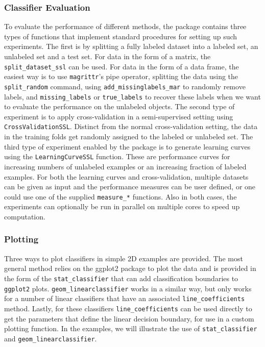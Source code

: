 \documentclass[runningheads,a4paper]{llncs}\usepackage[]{graphicx}\usepackage[]{color}
\begin{document}
\subsubsection{Classifier Evaluation}
To evaluate the performance of different methods, the package contains three types of functions that implement standard procedures for setting up such experiments. The first is by splitting a fully labeled dataset into a labeled set, an unlabeled set and a test set. For data in the form of a matrix, the \texttt{split\_dataset\_ssl} can be used. For data in the form of a data frame, the easiest way is to use \texttt{magrittr}'s pipe operator, splitting the data using the \texttt{split\_random} command, using \texttt{add\_missinglabels\_mar} to randomly remove labels, and \texttt{missing\_labels} or \texttt{true\_labels} to recover these labels when we want to evaluate the performance on the unlabeled objects.
The second type of experiment is to apply cross-validation in a semi-supervised setting using \texttt{CrossValidationSSL}. Distinct from the normal cross-validation setting, the data in the training folds get randomly assigned to the labeled or unlabeled set.
The third type of experiment enabled by the package is to generate learning curves using the \texttt{LearningCurveSSL} function. These are performance curves for increasing numbers of unlabeled examples or an increasing fraction of labeled examples. 
For both the learning curves and cross-validation, multiple datasets can be given as input and the performance measures can be user defined, or one could use one of the supplied \texttt{measure\_*} functions. Also in both cases, the experiments can optionally be run in parallel on multiple cores to speed up computation.

\subsubsection{Plotting}
Three ways to plot classifiers in simple 2D examples are provided. The most general method relies on the ggplot2 package \cite{Wickham2009} to plot the data and is provided in the form of the \texttt{stat\_classifier} that can add  classification boundaries to \texttt{ggplot2} plots. \texttt{geom\_linearclassifier} works in a similar way, but only works for a number of linear classifiers that have an associated \texttt{line\_coefficients} method. Lastly, for these classifiers \texttt{line\_coefficients} can be used directly to get the parameters that define the linear decision boundary, for use in a custom plotting function. In the examples, we will illustrate the use of \texttt{stat\_classifier} and \texttt{geom\_linearclassifier}.
\end{document}
